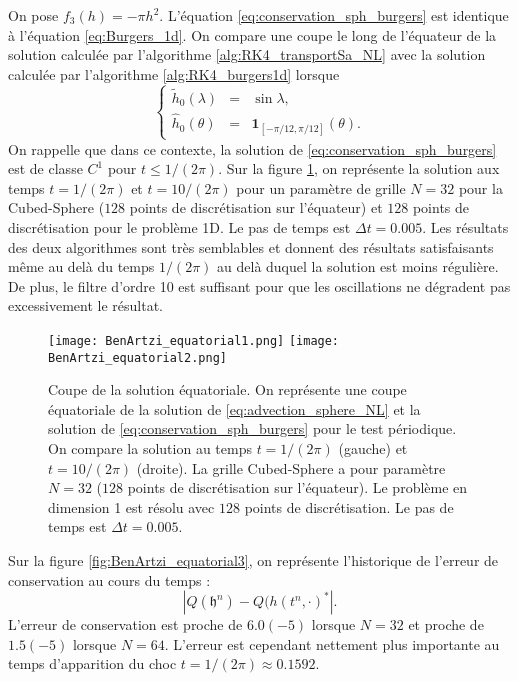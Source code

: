 On pose $f_3(h) = - \pi h^2$. L'équation \eqref{eq:conservation_sph_burgers} est identique à l'équation \eqref{eq:Burgers_1d}. On compare une coupe le long de l'équateur de la solution calculée par l'algorithme \ref{alg:RK4_transportSa_NL} avec la solution calculée par l'algorithme \ref{alg:RK4_burgers1d} lorsque
\begin{equation}
\left\lbrace
\begin{array}{rcl}
\tilde{h}_0(\lambda) & = & \sin \lambda, \\
\hat{h}_0(\theta) & = & \mathbf{1}_{[-\pi/12, \pi/12]}(\theta).
\end{array}
\right.
\end{equation}
On rappelle que dans ce contexte, la solution de \eqref{eq:conservation_sph_burgers} est de classe $C^1$ pour $t \leq 1/(2 \pi)$. Sur la figure \ref{fig:BenArtzi_equatorial1}, on représente la solution aux temps $t=1/(2 \pi)$ et $t=10/(2\pi)$ pour un paramètre de grille $N=32$ pour la Cubed-Sphere ($128$ points de discrétisation sur l'équateur) et $128$ points de discrétisation pour le problème 1D. Le pas de temps est $\Delta t=0.005$. Les résultats des deux algorithmes sont très semblables et donnent des résultats satisfaisants même au delà du temps $1/(2 \pi)$ au delà duquel la solution est moins régulière. De plus, le filtre d'ordre 10 est suffisant pour que les oscillations ne dégradent pas excessivement le résultat.

\begin{figure}[htbp]
\begin{center}
\texttt{[image: BenArtzi\_equatorial1.png]}
\texttt{[image: BenArtzi\_equatorial2.png]}
\end{center}
\caption{Coupe de la solution équatoriale. On représente une coupe équatoriale de la solution de \eqref{eq:advection_sphere_NL} et la solution de \eqref{eq:conservation_sph_burgers} pour le test périodique. On compare la solution au temps $t=1/(2\pi)$ (gauche) et $t=10/(2\pi)$ (droite). La grille Cubed-Sphere a pour paramètre $N=32$ ($128$ points de discrétisation sur l'équateur). Le problème en dimension 1 est résolu avec $128$ points de discrétisation. Le pas de temps est $\Delta t = 0.005$.}
\label{fig:BenArtzi_equatorial1}
\end{figure} 

Sur la figure \ref{fig:BenArtzi_equatorial3}, on représente l'historique de l'erreur de conservation au cours du temps :
\begin{equation}
|Q(\mathfrak{h}^n) - Q(h(t^n, \cdot)^*|.
\end{equation}
L'erreur de conservation est proche de $6.0 (-5)$ lorsque $N=32$ et proche de $1.5 (-5)$ lorsque $N=64$. L'erreur est cependant nettement plus importante au temps d'apparition du choc $t=1/(2\pi) \approx 0.1592$. 

